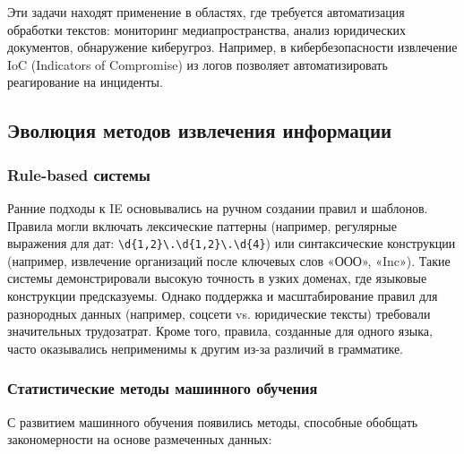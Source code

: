 Эти задачи находят применение в областях, где требуется автоматизация обработки текстов: мониторинг медиапространства, анализ юридических документов, обнаружение киберугроз. Например, в кибербезопасности извлечение IoC (Indicators of Compromise) из логов позволяет автоматизировать реагирование на инциденты.

\subsection{Эволюция методов извлечения информации}

\subsubsection{Rule-based системы}

Ранние подходы к IE основывались на ручном создании правил и шаблонов. Правила могли включать лексические паттерны (например, регулярные выражения для дат: \texttt{\textbackslash d\{1,2\}\textbackslash .\textbackslash d\{1,2\}\textbackslash .\textbackslash d\{4\}}) или синтаксические конструкции (например, извлечение организаций после ключевых слов «ООО», «Inc»). Такие системы демонстрировали высокую точность в узких доменах, где языковые конструкции предсказуемы. Однако поддержка и масштабирование правил для разнородных данных (например, соцсети vs. юридические тексты) требовали значительных трудозатрат. Кроме того, правила, созданные для одного языка, часто оказывались неприменимы к другим из-за различий в грамматике.

\subsubsection{Статистические методы машинного обучения}

С развитием машинного обучения появились методы, способные обобщать закономерности на основе размеченных данных:

